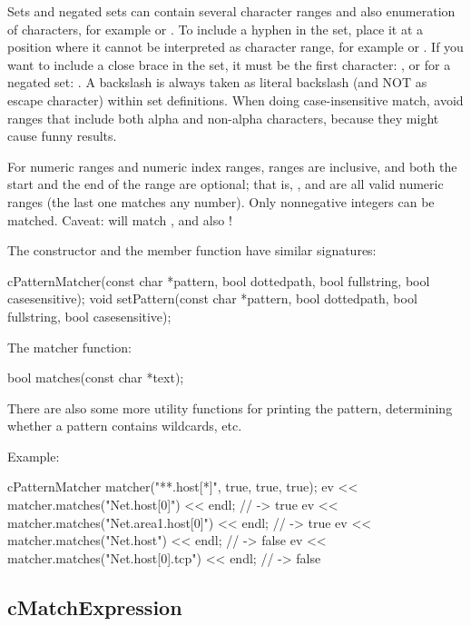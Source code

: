 Sets and negated sets can contain several character ranges and also
enumeration of characters, for example  or
. To include a hyphen in the set, place it at a position
where it cannot be interpreted as character range, for example
 or . If you want to include a close brace in
the set, it must be the first character: , or for a negated
set: . A backslash is always taken as
literal backslash (and NOT as escape character) within set definitions.
When doing case-insensitive match, avoid ranges that include both alpha and
non-alpha characters, because they might cause funny results.

For numeric ranges and numeric index ranges, ranges are inclusive, and both
the start and the end of the range are optional; that is, ,
 and  are all valid numeric ranges (the last one
matches any number). Only nonnegative integers can be matched. Caveat:
 will match ,  and also !

The  constructor and the  member
function have similar signatures:

\begin{cpp}
cPatternMatcher(const char *pattern, bool dottedpath, bool fullstring,
                bool casesensitive);
void setPattern(const char *pattern, bool dottedpath, bool fullstring,
                bool casesensitive);
\end{cpp}

The matcher function:

\begin{cpp}
bool matches(const char *text);
\end{cpp}

There are also some more utility functions for printing the pattern,
determining whether a pattern contains wildcards, etc.

Example:

\begin{cpp}
cPatternMatcher matcher("**.host[*]", true, true, true);
ev << matcher.matches("Net.host[0]") << endl;  // -> true
ev << matcher.matches("Net.area1.host[0]") << endl;  // -> true
ev << matcher.matches("Net.host") << endl;  // -> false
ev << matcher.matches("Net.host[0].tcp") << endl;  // -> false
\end{cpp}


\subsection{cMatchExpression}

